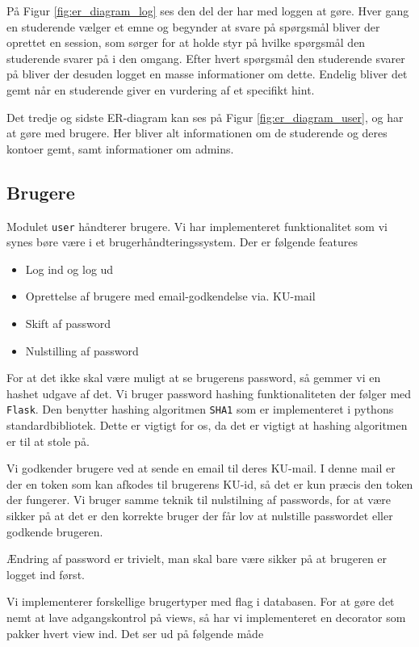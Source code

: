\documentclass[11pt, a4paper]{article}
\begin{document}
På Figur \ref{fig:er_diagram_log} ses den del der har med loggen at gøre. Hver gang en studerende vælger et emne og begynder at svare på spørgsmål bliver der oprettet en session, som sørger for at holde styr på hvilke spørgsmål den studerende svarer på i den omgang. Efter hvert spørgsmål den studerende svarer på bliver der desuden logget en masse informationer om dette. Endelig bliver det gemt når en studerende giver en vurdering af et specifikt hint.

Det tredje og sidste ER-diagram kan ses på Figur \ref{fig:er_diagram_user}, og har at gøre med brugere. Her bliver alt informationen om de studerende og deres kontoer gemt, samt informationer om admins.

\subsection{Brugere}
\label{sub:brugere}

Modulet \texttt{user} håndterer brugere. Vi har implementeret funktionalitet som vi synes børe være i et brugerhåndteringssystem. Der er følgende features
\begin{itemize}
    \item Log ind og log ud
    \item Oprettelse af brugere med email-godkendelse via. KU-mail
    \item Skift af password
    \item Nulstilling af password
\end{itemize}

For at det ikke skal være muligt at se brugerens password, så gemmer vi en hashet udgave af det. Vi bruger password hashing funktionaliteten der følger med \verb!Flask!. Den benytter hashing algoritmen \verb!SHA1! som er implementeret i pythons standardbibliotek. Dette er vigtigt for os, da det er vigtigt at hashing algoritmen er til at stole på.

Vi godkender brugere ved at sende en email til deres KU-mail. I denne mail er der en token som kan afkodes til brugerens KU-id, så det er kun præcis den token der fungerer. Vi bruger samme teknik til nulstilning af passwords, for at være sikker på at det er den korrekte bruger der får lov at nulstille passwordet eller godkende brugeren.

Ændring af password er trivielt, man skal bare være sikker på at brugeren er logget ind først.

Vi implementerer forskellige brugertyper med flag i databasen. For at gøre det nemt at lave adgangskontrol på views, så har vi implementeret en decorator som pakker hvert view ind. Det ser ud på følgende måde
\end{document}
